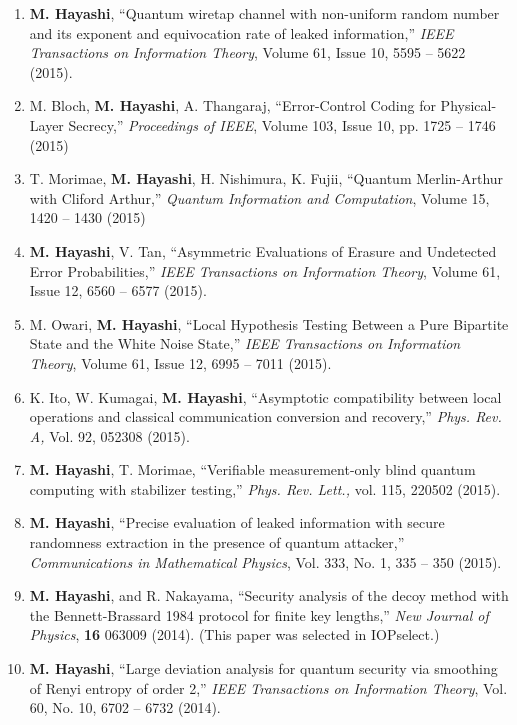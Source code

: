 \documentclass[a4paper,12pt,oneside]{article}
\begin{document}
\begin{enumerate}
\item 
\textbf{M. Hayashi}, ``Quantum wiretap channel with non-uniform random number and its exponent and equivocation rate of leaked information,'' 
{\em IEEE Transactions on Information Theory}, Volume 61, Issue 10, 5595 -- 5622 (2015). 

\item 
M. Bloch, \textbf{M. Hayashi}, A. Thangaraj, ``Error-Control Coding for Physical-Layer Secrecy,'' 
{\em Proceedings of IEEE}, Volume 103, Issue 10, pp. 1725 -- 1746 (2015) 

\item 
T. Morimae, \textbf{M. Hayashi}, H. Nishimura, K. Fujii, ``Quantum Merlin-Arthur with Cliford Arthur,'' 
{\em Quantum Information and Computation}, 
Volume 15, 1420 -- 1430 (2015)

\item 
\textbf{M. Hayashi}, V. Tan, ``Asymmetric Evaluations of Erasure and Undetected Error Probabilities,'' 
{\em IEEE Transactions on Information Theory}, Volume 61, Issue 12, 6560 -- 6577 (2015). 

\item 
M. Owari, \textbf{M. Hayashi}, ``Local Hypothesis Testing Between a Pure Bipartite State and the White Noise State,'' 
{\em IEEE Transactions on Information Theory}, 
Volume 61, Issue 12, 6995 -- 7011 (2015).

\item 
K. Ito, W. Kumagai, \textbf{M. Hayashi}, ``Asymptotic compatibility between local operations and classical communication conversion and recovery,'' 
{\em Phys. Rev. A,} Vol. 92, 052308 (2015). 

\item 
\textbf{M. Hayashi}, T. Morimae, ``Verifiable measurement-only blind quantum computing with stabilizer testing,'' 
{\em Phys. Rev. Lett.,} vol. 115, 220502 (2015). 

\item 
\textbf{M. Hayashi},
``Precise evaluation of leaked information with secure randomness extraction in the
presence of quantum attacker,'' {\em Communications in Mathematical Physics},
Vol. 333, No. 1, 335 -- 350 (2015).

\item 
\textbf{M. Hayashi}, and R. Nakayama, 
``Security analysis of the decoy method with the Bennett-Brassard 1984 protocol for finite key lengths,'' 
{\em New Journal of Physics}, {\bf 16} 063009 (2014).
(This paper was selected in IOPselect.)

\item 
\textbf{M. Hayashi}, 
``Large deviation analysis for quantum security via smoothing of Renyi entropy of order 2,'' 
{\em IEEE Transactions on Information Theory},
 Vol. 60,  No. 10, 6702 -- 6732 (2014).


\end{enumerate}
\end{document}
